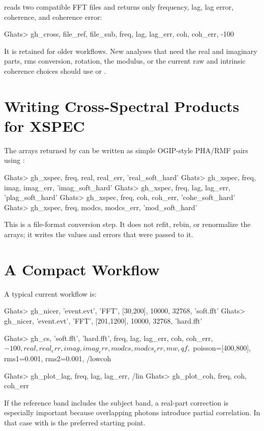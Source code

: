  reads two compatible FFT files and returns only frequency,
lag, lag error, coherence, and coherence error:

\begin{ghatsconsole}
Ghats> gh_cross, file_ref, file_sub, freq, lag, lag_err, coh, coh_err, -100
\end{ghatsconsole}

It is retained for older workflows.  New analyses that need the real and
imaginary parts, rms conversion, rotation, the modulus, or the current raw and
intrinsic coherence choices should use  or
.

\section{Writing Cross-Spectral Products for XSPEC}

The arrays returned by  can be written as simple OGIP-style
PHA/RMF pairs using :

\begin{ghatsconsole}
Ghats> gh_xspec, freq, real, real_err, 'real_soft_hard'
Ghats> gh_xspec, freq, imag, imag_err, 'imag_soft_hard'
Ghats> gh_xspec, freq, lag,  lag_err,  'plag_soft_hard'
Ghats> gh_xspec, freq, coh,  coh_err,  'cohe_soft_hard'
Ghats> gh_xspec, freq, modcs, modcs_err, 'mod_soft_hard'
\end{ghatsconsole}

This is a file-format conversion step.  It does not refit, rebin, or
renormalize the arrays; it writes the values and errors that were passed to
it.

\section{A Compact Workflow}

A typical current workflow is:

\begin{ghatsconsole}
Ghats> gh_nicer, 'event.evt', 'FFT', [30,200], 10000, 32768, 'soft.fft'
Ghats> gh_nicer, 'event.evt', 'FFT', [201,1200], 10000, 32768, 'hard.fft'

Ghats> gh_cs, 'soft.fft', 'hard.fft', freq, lag, lag_err, coh, coh_err, $
       -100, real, real_err, imag, imag_err, modcs, modcs_err, mw, qf, $
       poisson=[400,800], rms1=0.001, rms2=0.001, /lowcoh

Ghats> gh_plot_lag, freq, lag, lag_err, /lin
Ghats> gh_plot_coh, freq, coh, coh_err
\end{ghatsconsole}

If the reference band includes the subject band, a real-part correction is
especially important because overlapping photons introduce partial
correlation.  In that case  with  is
the preferred starting point.
